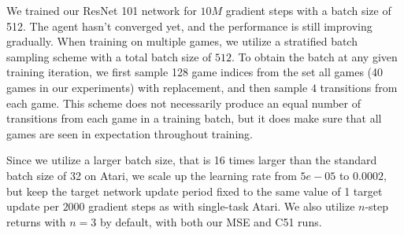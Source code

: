 We trained our ResNet 101 network for $10M$ gradient steps with a batch size of 512. The agent hasn't converged yet, and the performance is still improving gradually. When training on multiple games, we utilize a stratified batch sampling scheme with a total batch size of $512$. To obtain the batch at any given training iteration, we first sample 128 game indices from the set all games (40 games in our experiments) with replacement, and then sample $4$ transitions from each game. This scheme does not necessarily produce an equal number of transitions from each game in a training batch, but it does make sure that all games are seen in expectation throughout training.

Since we utilize a larger batch size, that is 16 times larger than the standard batch size of 32 on Atari, we scale up the learning rate from $5e-05$ to $0.0002$, but keep the target network update period fixed to the same value of 1 target update per $2000$ gradient steps as with single-task Atari. We also utilize $n$-step returns with $n=3$ by default, with both our MSE and C51 runs.

\begin{table}[t]
\small
\caption{\textbf{Hyperparameters used by multi-game training.} Here we report the key hyperparameters used by the multi-game training. The differences from the standard single-game training setup are highlighted in red.} 
\vspace{0.05cm}
\centering
{}
\label{table:hyperparams_atari}
\end{table}

